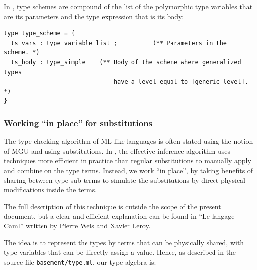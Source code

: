 \medskip
In \focalize, type schemes are compound of the list of the polymorphic
type variables that are its parameters and the type expression that is
its body:
{\footnotesize
\begin{lstlisting}[language=MyOCaml, title=An ``expression'' AST node]
type type_scheme = {
  ts_vars : type_variable list ;          (** Parameters in the scheme. *)
  ts_body : type_simple    (** Body of the scheme where generalized types
                               have a level equal to [generic_level]. *)
}
\end{lstlisting}
}



\subsubsection{Working ``in place'' for substitutions}
The type-checking algorithm of ML-like languages is often stated using
the notion of MGU and using substitutions. In \focalize, the effective
inference algorithm uses techniques more efficient in practice than
regular substitutions to manually apply and combine on the type
terms. Instead, we work ``in place'', by taking benefits of sharing
between type sub-terms to simulate the substitutions by direct
physical modifications inside the terms.

\medskip
The full description of this technique is outside the scope of the
present document, but a clear and efficient explanation can be found
in ``Le langage Caml'' written by Pierre Weis and Xavier Leroy.

\medskip
The idea is to represent the types by terms that can be physically
shared, with type variables that can be directly assign a
value. Hence, as described in the source file {\tt basement/type.ml},
our type algebra is:


